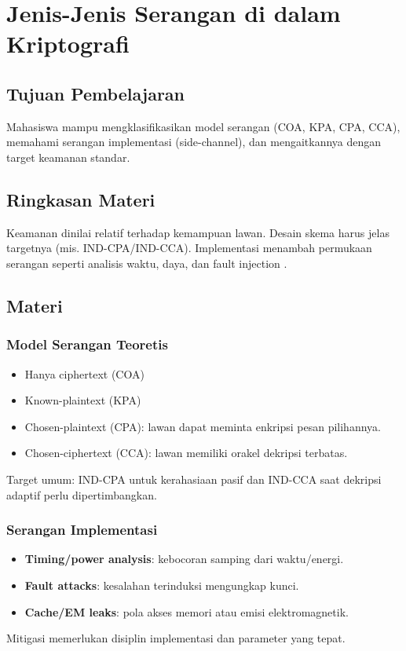 \documentclass[../main.tex]{subfiles}
\begin{document}
\chapter{Jenis-Jenis Serangan di dalam Kriptografi}\label{ch:serangan}
\section{Tujuan Pembelajaran}
Mahasiswa mampu mengklasifikasikan model serangan (COA, KPA, CPA, CCA), memahami serangan implementasi (side-channel), dan mengaitkannya dengan target keamanan standar.

\section{Ringkasan Materi}
Keamanan dinilai relatif terhadap kemampuan lawan. Desain skema harus jelas targetnya (mis. IND-CPA/IND-CCA). Implementasi menambah permukaan serangan seperti analisis waktu, daya, dan fault injection \citep{bonehshoup,bellare_rogaway_notes}.

\section{Materi}
\subsection{Model Serangan Teoretis}
\begin{itemize}
  \item Hanya ciphertext (COA)
  \item Known-plaintext (KPA)
  \item Chosen-plaintext (CPA): lawan dapat meminta enkripsi pesan pilihannya.
  \item Chosen-ciphertext (CCA): lawan memiliki orakel dekripsi terbatas.
\end{itemize}
Target umum: IND-CPA untuk kerahasiaan pasif dan IND-CCA saat dekripsi adaptif perlu dipertimbangkan.

\subsection{Serangan Implementasi}
\begin{itemize}
  \item \textbf{Timing/power analysis}: kebocoran samping dari waktu/energi.
  \item \textbf{Fault attacks}: kesalahan terinduksi mengungkap kunci.
  \item \textbf{Cache/EM leaks}: pola akses memori atau emisi elektromagnetik.
\end{itemize}
Mitigasi memerlukan disiplin implementasi dan parameter yang tepat.
\end{document}
